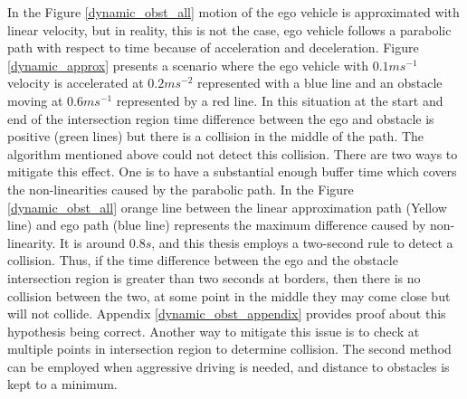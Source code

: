 In the Figure \ref{dynamic_obst_all} motion of the ego vehicle is approximated with linear velocity, but in reality, this is not the case, ego vehicle follows a parabolic path with respect to time because of acceleration and deceleration. Figure \ref{dynamic_approx} presents a scenario where the ego vehicle with $0.1ms^{-1}$ velocity is accelerated at $0.2ms^{-2}$ represented with a blue line and an obstacle moving at $0.6ms^{-1}$ represented by a red line. In this situation at the start and end of the intersection region time difference between the ego and obstacle is positive (green lines) but there is a collision in the middle of the path. The algorithm mentioned above could not detect this collision. There are two ways to mitigate this effect. One is to have a substantial enough buffer time which covers the non-linearities caused by the parabolic path. In the Figure \ref{dynamic_obst_all} orange line between the linear approximation path (Yellow line) and ego path (blue line) represents the maximum difference caused by non-linearity. It is around $0.8s$, and this thesis employs a two-second rule to detect a collision. Thus, if the time difference between the ego and the obstacle intersection region is greater than two seconds at borders, then there is no collision between the two, at some point in the middle they may come close but will not collide. Appendix \ref{dynamic_obst_appendix} provides proof about this hypothesis being correct. Another way to mitigate this issue is to check at multiple points in intersection region to determine collision. The second method can be employed when aggressive driving is needed, and distance to obstacles is kept to a minimum.


